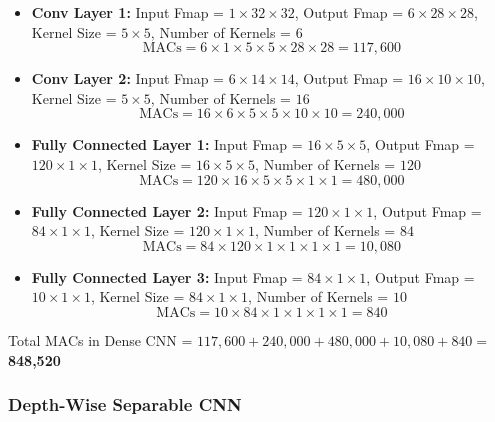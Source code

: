 \documentclass{article}
\begin{document}
\begin{itemize}
    \item \textbf{Conv Layer 1:} Input Fmap = $1 \times 32 \times 32$, Output Fmap = $6 \times 28 \times 28$, Kernel Size = $5 \times 5$, Number of Kernels = $6$
    \begin{equation}
        \text{MACs} = 6 \times 1 \times 5 \times 5 \times 28 \times 28 = 117,600
    \end{equation}
    
    \item \textbf{Conv Layer 2:} Input Fmap = $6 \times 14 \times 14$, Output Fmap = $16 \times 10 \times 10$, Kernel Size = $5 \times 5$, Number of Kernels = $16$
    \begin{equation}
        \text{MACs} = 16 \times 6 \times 5 \times 5 \times 10 \times 10 = 240,000
    \end{equation}
    
    \item \textbf{Fully Connected Layer 1:} Input Fmap = $16 \times 5 \times 5$, Output Fmap = $120 \times 1 \times 1$, Kernel Size = $16 \times 5 \times 5$, Number of Kernels = $120$
    \begin{equation}
        \text{MACs} = 120 \times 16 \times 5 \times 5 \times 1 \times 1 = 480,000
    \end{equation}
    
    \item \textbf{Fully Connected Layer 2:} Input Fmap = $120 \times 1 \times 1$, Output Fmap = $84 \times 1 \times 1$, Kernel Size = $120 \times 1 \times 1$, Number of Kernels = $84$
    \begin{equation}
        \text{MACs} = 84 \times 120 \times 1 \times 1 \times 1 \times 1 = 10,080
    \end{equation}
    
    \item \textbf{Fully Connected Layer 3:} Input Fmap = $84 \times 1 \times 1$, Output Fmap = $10 \times 1 \times 1$, Kernel Size = $84 \times 1 \times 1$, Number of Kernels = $10$
    \begin{equation}
        \text{MACs} = 10 \times 84 \times 1 \times 1 \times 1 \times 1 = 840
    \end{equation}
\end{itemize}

Total MACs in Dense CNN = $117,600 + 240,000 + 480,000 + 10,080 + 840 =$ \textbf{848,520}

\subsubsection{Depth-Wise Separable CNN}
\end{document}
